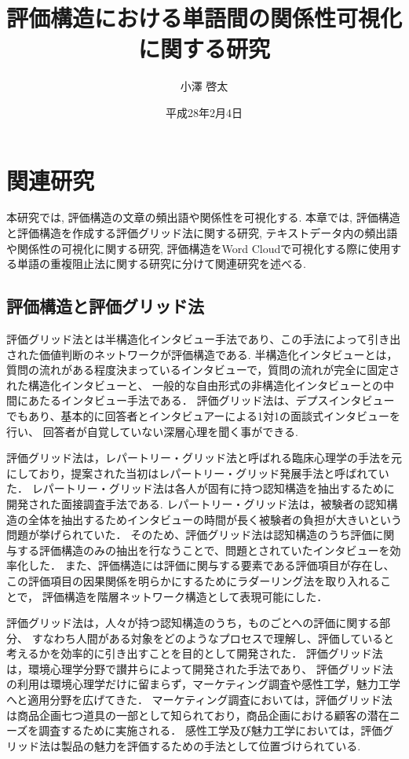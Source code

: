 \documentclass[syuuron]{kuee}
\title{評価構造における単語間の関係性可視化に関する研究}
\author{小澤 啓太}
\date{平成28年2月4日}
\begin{document}
\maketitle
\tableofcontents

\chapter{関連研究}%
	本研究では, 評価構造の文章の頻出語や関係性を可視化する. 本章では, 評価構造と評価構造を作成する評価グリッド法に関する研究, 
	テキストデータ内の頻出語や関係性の可視化に関する研究, 評価構造をWord Cloudで可視化する際に使用する単語の重複阻止法に関する研究に分けて関連研究を述べる. 
	\section{評価構造と評価グリッド法}
		評価グリッド法とは半構造化インタビュー手法であり、この手法によって引き出された価値判断のネットワークが評価構造である\cite{egm6, egm7}. 
		半構造化インタビューとは，質問の流れがある程度決まっているインタビューで，質問の流れが完全に固定された構造化インタビューと、
		一般的な自由形式の非構造化インタビューとの中間にあたるインタビュー手法である．
		評価グリッド法は、デプスインタビューでもあり、基本的に回答者とインタビュアーによる1対1の面談式インタビューを行い、
		回答者が自覚していない深層心理を聞く事ができる. 
		
		評価グリッド法は，レパートリー・グリッド法\cite{rg1}と呼ばれる臨床心理学の手法を元にしており，提案された当初はレパートリー・グリッド発展手法と呼ばれていた．
		レパートリー・グリッド法は各人が固有に持つ認知構造を抽出するために開発された面接調査手法である. 
		レパートリー・グリッド法は，被験者の認知構造の全体を抽出するためインタビューの時間が長く被験者の負担が大きいという問題が挙げられていた．
		そのため、評価グリッド法は認知構造のうち評価に関与する評価構造のみの抽出を行なうことで、問題とされていたインタビューを効率化した．
		また、評価構造には評価に関与する要素である評価項目が存在し、この評価項目の因果関係を明らかにするためにラダーリング法を取り入れることで，
		評価構造を階層ネットワーク構造として表現可能にした．
		
		評価グリッド法は，人々が持つ認知構造のうち，ものごとへの評価に関する部分、
		すなわち人間がある対象をどのようなプロセスで理解し、評価していると考えるかを効率的に引き出すことを目的として開発された．
		評価グリッド法は，環境心理学分野で讃井らによって開発された手法であり、
		評価グリッド法の利用は環境心理学だけに留まらず，マーケティング調査や感性工学，魅力工学へと適用分野を広げてきた．
		マーケティング調査においては，評価グリッド法は商品企画七つ道具の一部として知られており，商品企画における顧客の潜在ニーズを調査するために実施される．
		感性工学及び魅力工学においては，評価グリッド法は製品の魅力を評価するための手法として位置づけられている. 
		
\end{document}
